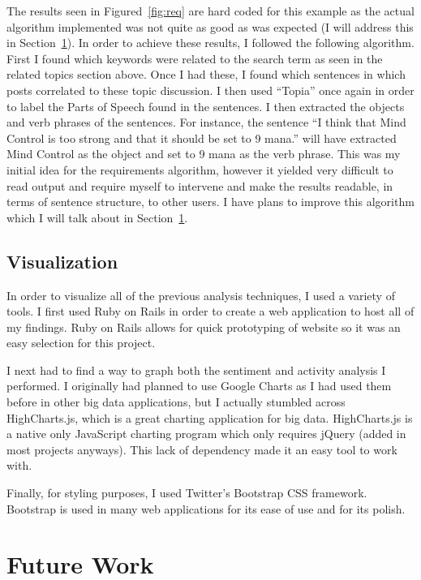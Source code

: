 \documentclass[conference]{IEEEtran}
\begin{document}
The results seen in Figured~\ref{fig:req} are hard coded for this example as the actual algorithm implemented
was not quite as good as was expected (I will address this in Section~\ref{sec:fw}). In order to achieve these
results, I followed the following algorithm. First I found which keywords were related to the search term as
seen in the related topics section above. Once I had these, I found which sentences in which posts correlated
to these topic discussion. I then used ``Topia'' once again in order to label the Parts of Speech found in
the sentences. I then extracted the objects and verb phrases of the sentences. For instance, the sentence 
``I think that Mind Control is too strong and that it should be set to 9 mana.'' will have extracted
Mind Control as the object and set to 9 mana as the verb phrase. This was my initial idea for the requirements
algorithm, however it yielded very difficult to read output and require myself to intervene and make the
results readable, in terms of sentence structure, to other users. I have plans to improve this algorithm
which I will talk about in Section~\ref{sec:fw}.

\subsection{Visualization}

In order to visualize all of the previous analysis techniques, I used a variety of tools. I first used Ruby
on Rails in order to create a web application to host all of my findings. Ruby on Rails allows for quick prototyping
of website so it was an easy selection for this project.

I next had to find a way to graph both the sentiment and activity analysis I performed. I originally had planned
to use Google Charts as I had used them before in other big data applications, but I actually stumbled across
HighCharts.js, which is a great charting application for big data. HighCharts.js is a native only JavaScript
charting program which only requires jQuery (added in most projects anyways). This lack of dependency made it
an easy tool to work with. 

Finally, for styling purposes, I used Twitter's Bootstrap CSS framework. Bootstrap is used in many web applications
for its ease of use and for its polish.

\section{Future Work}
\label{sec:fw}
\end{document}

